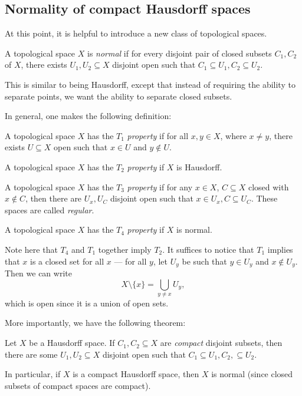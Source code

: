\documentclass[a4paper]{article}
\begin{document}
\subsection{Normality of compact Hausdorff spaces}
At this point, it is helpful to introduce a new class of topological spaces.
\begin{defi}
  A topological space $X$ is \emph{normal} if for every disjoint pair of closed subsets $C_1, C_2$ of $X$, there exists $U_1, U_2 \subseteq X$ disjoint open such that $C_1 \subseteq U_1, C_2 \subseteq U_2$.
\end{defi}
This is similar to being Hausdorff, except that instead of requiring the ability to separate points, we want the ability to separate closed subsets.

In general, one makes the following definition:
\begin{defi}[$T_i$ space]
  A topological space $X$ has the $T_1$ \emph{property} if for all $x, y\in X$, where $x \not= y$, there exists $U\subseteq X$ open such that $x \in U$ and $y\not\in U$.

  A topological space $X$ has the $T_2$ \emph{property} if $X$ is Hausdorff.

  A topological space $X$ has the $T_3$ \emph{property} if for any $x \in X$, $C\subseteq X$ closed with $x \not\in C$, then there are $U_x, U_C$ disjoint open such that $x \in U_x, C\subseteq U_C$. These spaces are called \emph{regular}.

  A topological space $X$ has the $T_4$ \emph{property} if $X$ is normal.
\end{defi}
Note here that $T_4$ and $T_1$ together imply $T_2$. It suffices to notice that $T_1$ implies that $x$ is a closed set for all $x$ --- for all $y$, let $U_y$ be such that $y \in U_y$ and $x \not\in U_y$. Then we can write
\[
  X\setminus \{x\} = \bigcup_{y \not= x}U_y,
\]
which is open since it is a union of open sets.

More importantly, we have the following theorem:
\begin{thm}
  Let $X$ be a Hausdorff space. If $C_1, C_2 \subseteq X$ are \emph{compact} disjoint subsets, then there are some $U_1, U_2 \subseteq X$ disjoint open such that $C_1 \subseteq U_1, C_2, \subseteq U_2$.

  In particular, if $X$ is a compact Hausdorff space, then $X$ is normal (since closed subsets of compact spaces are compact).
\end{thm}
\end{document}
